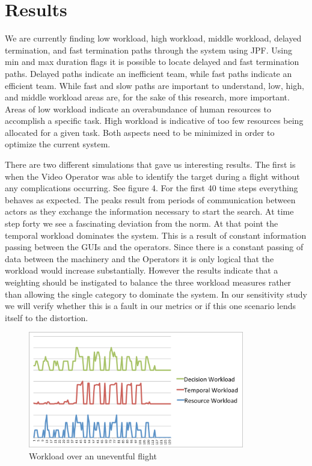 \section{Results}
We are currently finding low workload, high workload, middle workload, delayed termination, and fast termination paths through the system using JPF. Using min and max duration flags it is possible to locate delayed and fast termination paths. Delayed paths indicate an inefficient team, while fast paths indicate an efficient team. While fast and slow paths are important to understand, low, high, and middle workload areas are, for the sake of this research, more important. Areas of low workload indicate an overabundance of human resources to accomplish a specific task. High workload is indicative of too few resources being allocated for a given task. Both aspects need to be minimized in order to optimize the current system. 

	There are two different simulations that gave us interesting results. The first is when the Video Operator was able to identify the target during a flight without any complications occurring. See figure 4. For the first 40 time steps everything behaves as expected. The peaks result from periods of communication between actors as they exchange the information necessary to start the search. At time step forty we see a fascinating deviation from the norm. At that point the temporal workload dominates the system. This is a result of constant information passing between the GUIs and the operators. Since there is a constant passing of data between the machinery and the Operators it is only logical that the workload would increase substantially. However the results indicate that a weighting should be instigated to balance the three workload measures rather than allowing the single category to dominate the system. In our sensitivity study we will verify whether this is a fault in our metrics or if this one scenario lends itself to the distortion.

\begin{figure}[h]
\center
\setlength{\abovecaptionskip}{1mm}
\setlength{\belowcaptionskip}{1mm}
\setlength{\textfloatsep}{1mm}
\setlength{\floatsep}{1mm}
\includegraphics[height=2in]{WorkloadTargetSightingLabeled.png}
\caption{Workload over an uneventful flight}
\label{fig:WorkloadSim1}
\end{figure}

